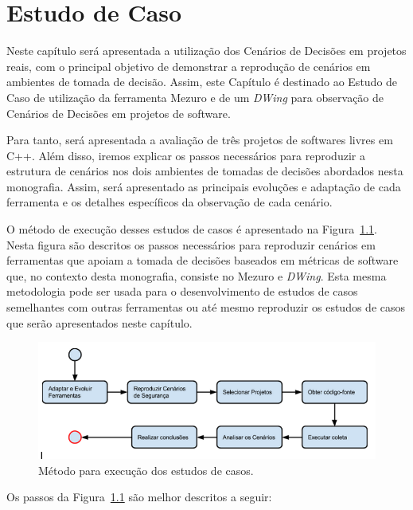 \chapter{Estudo de Caso}
\label{cap-case-study}

%

Neste capítulo será apresentada a utilização dos Cenários de Decisões em projetos reais, com o principal objetivo de demonstrar a reprodução de cenários em ambientes de tomada de decisão. Assim, este Capítulo é destinado ao Estudo de Caso de utilização da ferramenta Mezuro e de um \emph{DWing} para observação de Cenários de Decisões em projetos de software.

Para tanto, será apresentada a avaliação de três projetos de softwares livres em C++. Além disso, iremos explicar os passos necessários para reproduzir a estrutura de cenários nos dois ambientes de tomadas de decisões abordados nesta monografia. Assim, será apresentado as principais evoluções e adaptação de cada ferramenta e os detalhes específicos da observação de cada cenário.

O método de execução desses estudos de casos é apresentado na Figura~\ref{method}. Nesta figura são descritos os passos necessários para reproduzir cenários em ferramentas que apoiam a tomada de decisões baseados em métricas de software que, no contexto desta monografia, consiste no Mezuro e \emph{DWing}. Esta mesma metodologia pode ser usada para o desenvolvimento de estudos de casos semelhantes com outras ferramentas ou até mesmo reproduzir os estudos de casos que serão apresentados neste capítulo.

\graphicspath{{figuras/}}
\begin{figure}[h]
\centering
\includegraphics[width=1.0\textwidth]{fluxograma}
\caption{Método para execução dos estudos de casos.}
\label{method}
\end{figure}

Os passos da Figura~\ref{method} são melhor descritos a seguir:

